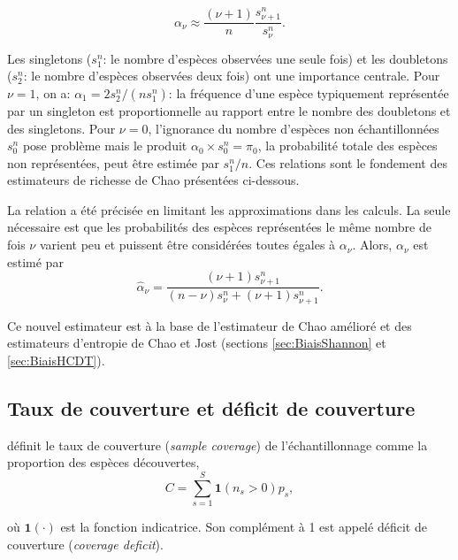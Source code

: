 \documentclass[
  11pt,
  french,
  a4paper,
  extrafontsizes,onecolumn,openright
  ]{memoir}
\begin{document}
\begin{equation}
  \label{eq:alphanu}
  \alpha_\nu \approx \frac{(\nu+1)}{n} \frac{s^{n}_{\nu+1}}{s^{n}_{\nu}}.
\end{equation}

Les singletons (\(s^{n}_{1}\): le nombre d'espèces observées une seule fois) et les doubletons (\(s^{n}_{2}\): le nombre d'espèces observées deux fois) ont une importance centrale.
Pour \(\nu=1\), on a: \(\alpha_1 = 2 s^{n}_{2}/(ns^{n}_{1})\): la fréquence d'une espèce typiquement représentée par un singleton est proportionnelle au rapport entre le nombre des doubletons et des singletons.
Pour \(\nu=0\), l'ignorance du nombre d'espèces non échantillonnées \(s^{n}_{0}\) pose problème mais le produit \(\alpha_0 \times s^{n}_{0} = \pi_0\), la probabilité totale des espèces non représentées, peut être estimée par \(s^{n}_{1}/n\).
Ces relations sont le fondement des estimateurs de richesse de Chao présentées ci-dessous.

La relation a été précisée \autocite[eq. 6 et 7a]{Chiu2014a} en limitant les approximations dans les calculs.
La seule nécessaire est que les probabilités des espèces représentées le même nombre de fois \(\nu\) varient peu et puissent être considérées toutes égales à \(\alpha_\nu\).
Alors, \(\alpha_\nu\) est estimé par
\begin{equation}
  \label{eq:GoodTuring2014}
  \hat{\alpha}_\nu = \frac{\left(\nu+1 \right) s^{n}_{\nu+1}}{\left(n-\nu \right) s^{n}_{\nu} + \left(\nu+1 \right) s^{n}_{\nu+1}}.
\end{equation}

Ce nouvel estimateur est à la base de l'estimateur de Chao amélioré et des estimateurs d'entropie de Chao et Jost (sections \ref{sec:BiaisShannon} et \ref{sec:BiaisHCDT}).

\hypertarget{taux-de-couverture-et-duxe9ficit-de-couverture}{%
\subsection{Taux de couverture et déficit de couverture}\label{taux-de-couverture-et-duxe9ficit-de-couverture}}

\textcite{Good1953} définit le taux de couverture (\emph{sample coverage}) de l'échantillonnage comme la proportion des espèces découvertes,
\begin{equation}
  \label{eq:C}
  C=\sum^S_{s=1}{{\mathbf 1}\left(n_s>0\right)p_s},
\end{equation}

où \({\mathbf 1}(\cdot)\) est la fonction indicatrice.
Son complément à 1 est appelé déficit de couverture (\emph{coverage deficit}).
\end{document}
